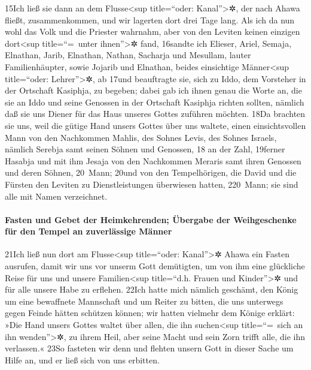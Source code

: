 15Ich ließ sie dann an dem Flusse\textless sup title=``oder:
Kanal''\textgreater✲, der nach Ahawa fließt, zusammenkommen, und wir
lagerten dort drei Tage lang. Als ich da nun wohl das Volk und die
Priester wahrnahm, aber von den Leviten keinen einzigen
dort\textless sup title=``=~unter ihnen''\textgreater✲ fand, 16sandte
ich Elieser, Ariel, Semaja, Elnathan, Jarib, Elnathan, Nathan, Sacharja
und Mesullam, lauter Familienhäupter, sowie Jojarib und Elnathan, beides
einsichtige Männer\textless sup title=``oder: Lehrer''\textgreater✲, ab
17und beauftragte sie, sich zu Iddo, dem Vorsteher in der Ortschaft
Kasiphja, zu begeben; dabei gab ich ihnen genau die Worte an, die sie an
Iddo und seine Genossen in der Ortschaft Kasiphja richten sollten,
nämlich daß sie uns Diener für das Haus unseres Gottes zuführen möchten.
18Da brachten sie uns, weil die gütige Hand unsers Gottes über uns
waltete, einen einsichtsvollen Mann von den Nachkommen Mahlis, des
Sohnes Levis, des Sohnes Israels, nämlich Serebja samt seinen Söhnen und
Genossen, 18 an der Zahl, 19ferner Hasabja und mit ihm Jesaja von den
Nachkommen Meraris samt ihren Genossen und deren Söhnen, 20~Mann; 20und
von den Tempelhörigen, die David und die Fürsten den Leviten zu
Dienstleistungen überwiesen hatten, 220~Mann; sie sind alle mit Namen
verzeichnet.

\hypertarget{fasten-und-gebet-der-heimkehrenden-uxfcbergabe-der-weihgeschenke-fuxfcr-den-tempel-an-zuverluxe4ssige-muxe4nner}{%
\paragraph{Fasten und Gebet der Heimkehrenden; Übergabe der
Weihgeschenke für den Tempel an zuverlässige
Männer}\label{fasten-und-gebet-der-heimkehrenden-uxfcbergabe-der-weihgeschenke-fuxfcr-den-tempel-an-zuverluxe4ssige-muxe4nner}}

21Ich ließ nun dort am Flusse\textless sup title=``oder:
Kanal''\textgreater✲ Ahawa ein Fasten ausrufen, damit wir uns vor unserm
Gott demütigten, um von ihm eine glückliche Reise für uns und unsere
Familien\textless sup title=``d.h. Frauen und Kinder''\textgreater✲ und
für alle unsere Habe zu erflehen. 22Ich hatte mich nämlich geschämt, den
König um eine bewaffnete Mannschaft und um Reiter zu bitten, die uns
unterwegs gegen Feinde hätten schützen können; wir hatten vielmehr dem
Könige erklärt: »Die Hand unsers Gottes waltet über allen, die ihn
suchen\textless sup title=``=~sich an ihn wenden''\textgreater✲, zu
ihrem Heil, aber seine Macht und sein Zorn trifft alle, die ihn
verlassen.« 23So fasteten wir denn und flehten unsern Gott in dieser
Sache um Hilfe an, und er ließ sich von uns erbitten.

